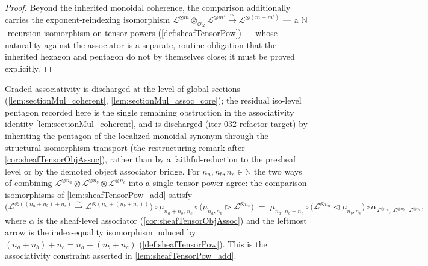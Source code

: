 \begin{proof}
  Beyond the inherited monoidal coherence, the comparison additionally carries the
  exponent-reindexing isomorphism \(\mathcal{L}^{\otimes m} \otimes_{\mathcal{O}_X}
  \mathcal{L}^{\otimes m'} \xrightarrow{\ \sim\ } \mathcal{L}^{\otimes (m+m')}\) ---
  a \(\mathbb{N}\)-recursion isomorphism on tensor powers
  (\cref{def:sheafTensorPow}) --- whose naturality against the associator is a
  separate, routine obligation that the inherited hexagon and pentagon do not by
  themselves close; it must be proved explicitly.
\end{proof}

\begin{lemma}
  \label{lem:tensorPowAdd_assoc}
  Graded associativity is discharged at the level of global sections
  (\cref{lem:sectionMul_coherent}, \cref{lem:sectionMul_assoc_core}); the residual
  iso-level pentagon recorded here is the single remaining obstruction in the
  associativity identity \cref{lem:sectionMul_coherent}, and is discharged (iter-032
  refactor target) by inheriting the pentagon of the localized monoidal synonym
  through the structural-isomorphism transport (the restructuring remark after
  \cref{cor:sheafTensorObjAssoc}), rather than by a faithful-reduction to the
  presheaf level or by the demoted object associator bridge.
  For \(n_a, n_b, n_c \in \mathbb{N}\) the two ways of combining
  \(\mathcal{L}^{\otimes n_a} \otimes \mathcal{L}^{\otimes n_b} \otimes
  \mathcal{L}^{\otimes n_c}\) into a single tensor power agree: the comparison
  isomorphisms of \cref{lem:sheafTensorPow_add} satisfy
  \[
    \bigl(\mathcal{L}^{\otimes ((n_a+n_b)+n_c)}
      \xrightarrow{\ \sim\ } \mathcal{L}^{\otimes (n_a+(n_b+n_c))}\bigr)
      \circ \mu_{n_a+n_b,\,n_c}
      \circ \bigl(\mu_{n_a,n_b} \rhd \mathcal{L}^{\otimes n_c}\bigr)
    \;=\;
    \mu_{n_a,\,n_b+n_c}
      \circ \bigl(\mathcal{L}^{\otimes n_a} \lhd \mu_{n_b,n_c}\bigr)
      \circ \alpha_{\mathcal{L}^{\otimes n_a},\,\mathcal{L}^{\otimes n_b},\,
        \mathcal{L}^{\otimes n_c}},
  \]
  where \(\alpha\) is the sheaf-level associator (\cref{cor:sheafTensorObjAssoc})
  and the leftmost arrow is the index-equality isomorphism induced by
  \((n_a+n_b)+n_c = n_a+(n_b+n_c)\) (\cref{def:sheafTensorPow}). This is the
  associativity constraint asserted in \cref{lem:sheafTensorPow_add}.
\end{lemma}

